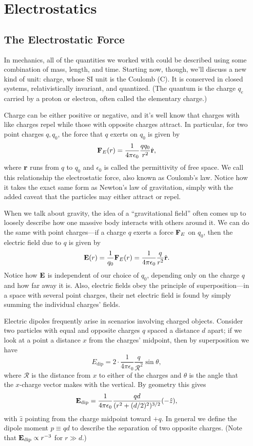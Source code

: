 \documentclass[../p051main.tex]{subfiles}
\begin{document}
\chapter{Electrostatics}
\section{The Electrostatic Force}
In mechanics, all of the quantities we worked with could be described using some combination of mass, length, and time.
Starting now, though, we'll discuss a new kind of unit: charge, whose SI unit is the Coulomb (C).
It is conserved in closed systems, relativistically invariant, and quantized.
(The quantum is the charge $q_e$ carried by a proton or electron, often called the elementary charge.)

Charge can be either positive or negative, and it's well know that charges with like charges repel while those with opposite charges attract.
In particular, for two point charges $q, q_0$, the force that $q$ exerts on $q_0$ is given by
\[ \mathbf{F}_E(r) = \frac{1}{4\pi \epsilon_0} \frac{qq_0}{r^2} \hat{\mathbf{r}}, \]
where $\mathbf{r}$ runs from $q$ to $q_0$ and $\epsilon_0$ is called the permittivity of free space.
We call this relationship the electrostatic force, also known as Coulomb's law.
Notice how it takes the exact same form as Newton's law of gravitation, simply with the added caveat that the particles may either attract or repel.

When we talk about gravity, the idea of a ``gravitational field'' often comes up to loosely describe how one massive body interacts with others around it.
We can do the same with point charges---if a charge $q$ exerts a force $\mathbf{F}_E$ on $q_0$, then the electric field due to $q$ is given by
\[ \mathbf{E}(r) = \frac{1}{q_0}\mathbf{F}_E(r) = \frac{1}{4\pi \epsilon_0} \frac{q}{r^2} \hat{\mathbf{r}}. \]
Notice how $\mathbf{E}$ is independent of our choice of $q_0$, depending only on the charge $q$ and how far away it is.
Also, electric fields obey the principle of superposition---in a space with several point charges, their net electric field is found by simply summing the individual charges' fields.

\begin{example}
    Electric dipoles frequently arise in scenarios involving charged objects.
    Consider two particles with equal and opposite charges $q$ spaced a distance $d$ apart; if we look at a point a distance $x$ from the charges' midpoint, then by superposition we have
    \[ E_\textrm{dip} = 2 \cdot \frac{1}{4\pi \epsilon_0} \frac{q}{\mathcal{R}^2} \sin\theta, \]
    where $\mathcal{R}$ is the distance from $x$ to either of the charges and $\theta$ is the angle that the $x$-charge vector makes with the vertical.
    By geometry this gives
    \[ \mathbf{E}_\textrm{dip} = \frac{1}{4\pi\epsilon_0} \frac{qd}{(r^2 + (d / 2)^2)^{3 / 2}} (-\hat z), \]
    with $\hat z$ pointing from the charge midpoint toward $+q$.
    In general we define the dipole moment $p \equiv qd$ to describe the separation of two opposite charges.
    (Note that $\mathbf{E}_\textrm{dip} \propto r^{-3}$ for $r \gg d$.)
\end{example}
\end{document}
